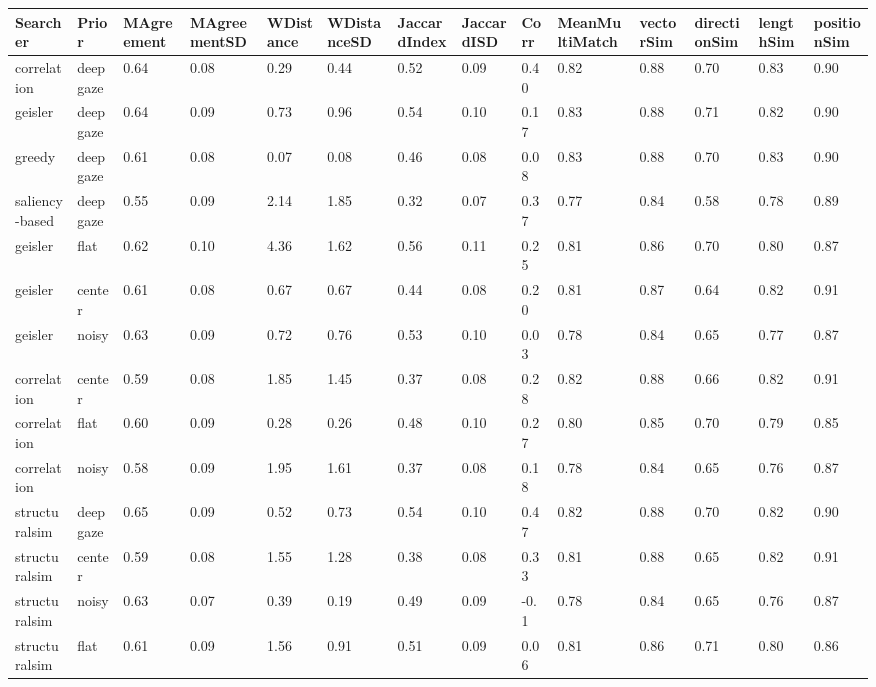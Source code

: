 \begin{tabular}{llllllllllllll}
Searcher & Prior & MAgreement & MAgreementSD & WDistance & WDistanceSD & JaccardIndex & JaccardISD & Corr & MeanMultiMatch & vectorSim & directionSim & lengthSim & positionSim \\ 
\hline 
correlation & deepgaze & 0.64 & 0.08 & 0.29 & 0.44 & 0.52 & 0.09 & 0.40 & 0.82 & 0.88 & 0.70 & 0.83 & 0.90 \\ 
geisler & deepgaze & 0.64 & 0.09 & 0.73 & 0.96 & 0.54 & 0.10 & 0.17 & 0.83 & 0.88 & 0.71 & 0.82 & 0.90 \\ 
greedy & deepgaze & 0.61 & 0.08 & 0.07 & 0.08 & 0.46 & 0.08 & 0.08 & 0.83 & 0.88 & 0.70 & 0.83 & 0.90 \\ 
saliency-based & deepgaze & 0.55 & 0.09 & 2.14 & 1.85 & 0.32 & 0.07 & 0.37 & 0.77 & 0.84 & 0.58 & 0.78 & 0.89 \\ 
geisler & flat & 0.62 & 0.10 & 4.36 & 1.62 & 0.56 & 0.11 & 0.25 & 0.81 & 0.86 & 0.70 & 0.80 & 0.87 \\ 
geisler & center & 0.61 & 0.08 & 0.67 & 0.67 & 0.44 & 0.08 & 0.20 & 0.81 & 0.87 & 0.64 & 0.82 & 0.91 \\ 
geisler & noisy & 0.63 & 0.09 & 0.72 & 0.76 & 0.53 & 0.10 & 0.03 & 0.78 & 0.84 & 0.65 & 0.77 & 0.87 \\ 
correlation & center & 0.59 & 0.08 & 1.85 & 1.45 & 0.37 & 0.08 & 0.28 & 0.82 & 0.88 & 0.66 & 0.82 & 0.91 \\ 
correlation & flat & 0.60 & 0.09 & 0.28 & 0.26 & 0.48 & 0.10 & 0.27 & 0.80 & 0.85 & 0.70 & 0.79 & 0.85 \\ 
correlation & noisy & 0.58 & 0.09 & 1.95 & 1.61 & 0.37 & 0.08 & 0.18 & 0.78 & 0.84 & 0.65 & 0.76 & 0.87 \\ 
structuralsim & deepgaze & 0.65 & 0.09 & 0.52 & 0.73 & 0.54 & 0.10 & 0.47 & 0.82 & 0.88 & 0.70 & 0.82 & 0.90 \\ 
structuralsim & center & 0.59 & 0.08 & 1.55 & 1.28 & 0.38 & 0.08 & 0.33 & 0.81 & 0.88 & 0.65 & 0.82 & 0.91 \\ 
structuralsim & noisy & 0.63 & 0.07 & 0.39 & 0.19 & 0.49 & 0.09 & -0.1 & 0.78 & 0.84 & 0.65 & 0.76 & 0.87 \\ 
structuralsim & flat & 0.61 & 0.09 & 1.56 & 0.91 & 0.51 & 0.09 & 0.06 & 0.81 & 0.86 & 0.71 & 0.80 & 0.86 \\ 
\hline 
\end{tabular}